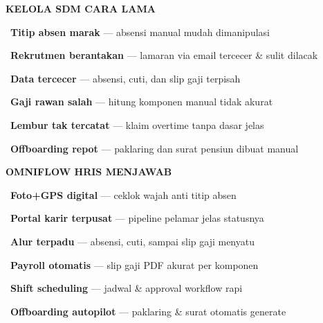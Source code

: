 \documentclass[a4paper]{article}
\begin{document}
\noindent
\begin{minipage}[t]{0.485\textwidth}
    \colorbox{RedLight}{%
        \begin{minipage}{\dimexpr\textwidth-2\fboxsep\relax}
            {\fontsize{10}{13}\selectfont\bfseries\color{RedText} KELOLA SDM CARA LAMA}
        \end{minipage}}\par
    \vspace{4pt}

    {\fontsize{9.5}{13}\selectfont\color{TextDark}%
    \textbullet\ \textbf{Titip absen marak} --- absensi manual mudah dimanipulasi\par\vspace{4pt}%
    \textbullet\ \textbf{Rekrutmen berantakan} --- lamaran via email tercecer \& sulit dilacak\par\vspace{4pt}%
    \textbullet\ \textbf{Data tercecer} --- absensi, cuti, dan slip gaji terpisah\par\vspace{4pt}%
    \textbullet\ \textbf{Gaji rawan salah} --- hitung komponen manual tidak akurat\par\vspace{4pt}%
    \textbullet\ \textbf{Lembur tak tercatat} --- klaim overtime tanpa dasar jelas\par\vspace{4pt}%
    \textbullet\ \textbf{Offboarding repot} --- paklaring dan surat pensiun dibuat manual}%
\end{minipage}%
\hfill%
\begin{minipage}[t]{0.485\textwidth}
    \colorbox{BluePrimary}{%
        \begin{minipage}{\dimexpr\textwidth-2\fboxsep\relax}
            {\fontsize{10}{13}\selectfont\bfseries\color{White} OMNIFLOW HRIS MENJAWAB}
        \end{minipage}}\par
    \vspace{4pt}

    {\fontsize{9.5}{13}\selectfont\color{TextDark}%
    \textbullet\ \textbf{Foto+GPS digital} --- ceklok wajah anti titip absen\par\vspace{4pt}%
    \textbullet\ \textbf{Portal karir terpusat} --- pipeline pelamar jelas statusnya\par\vspace{4pt}%
    \textbullet\ \textbf{Alur terpadu} --- absensi, cuti, sampai slip gaji menyatu\par\vspace{4pt}%
    \textbullet\ \textbf{Payroll otomatis} --- slip gaji PDF akurat per komponen\par\vspace{4pt}%
    \textbullet\ \textbf{Shift scheduling} --- jadwal \& approval workflow rapi\par\vspace{4pt}%
    \textbullet\ \textbf{Offboarding autopilot} --- paklaring \& surat otomatis generate}%
\end{minipage}
\end{document}
